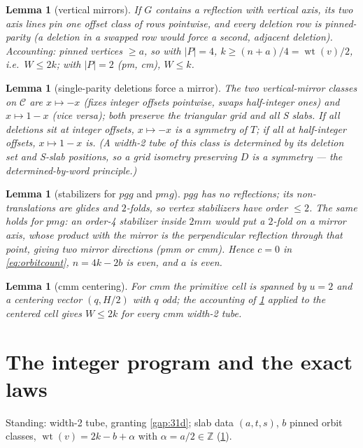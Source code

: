 \documentclass[11pt,a4paper,oneside]{article}
\theoremstyle{plain}
\newtheorem{lemma}[theorem]{Lemma}
\theoremstyle{definition}
\theoremstyle{remark}
\DeclareMathOperator{\wt}{wt}
\newcommand{\ZZ}{\mathbb{Z}}
\begin{document}
\begin{lemma}[vertical mirrors]\label{lem:vmirror}
If $G$ contains a reflection with vertical axis, its two axis lines pin one offset class of
rows pointwise, and every deletion row is pinned-parity (a deletion in a swapped row would
force a second, adjacent deletion). Accounting: pinned vertices $\ge a$, so with $|P| = 4$,
$k \ge (n + a)/4 = \wt(v)/2$, i.e.\ $W \le 2k$; with $|P| = 2$ (pm, cm), $W \le k$.
\end{lemma}

\begin{lemma}[single-parity deletions force a mirror]\label{lem:parity-mirror}
The two vertical-mirror classes on $\mathcal{C}$ are $x \mapsto -x$ (fixes integer offsets
pointwise, swaps half-integer ones) and $x \mapsto 1 - x$ (vice versa); both preserve the
triangular grid and all S slabs. If all deletions sit at integer offsets, $x \mapsto -x$ is
a symmetry of $T$; if all at half-integer offsets, $x \mapsto 1 - x$ is. (A width-2 tube of
this class is determined by its deletion set and S-slab positions, so a grid isometry
preserving $D$ is a symmetry --- the \emph{determined-by-word principle}.)
\end{lemma}

\begin{lemma}[stabilizers for $pgg$ and $pmg$]\label{lem:stab}
$pgg$ has no reflections; its non-translations are glides and $2$-folds, so vertex
stabilizers have order $\le 2$. The same holds for $pmg$: an order-4 stabilizer inside
$2mm$ would put a $2$-fold on a mirror axis, whose product with the mirror is the
perpendicular reflection through that point, giving two mirror directions (pmm or cmm).
Hence $c = 0$ in \cref{eq:orbitcount}, $n = 4k - 2b$ is even, and $a$ is even.
\end{lemma}

\begin{lemma}[cmm centering]\label{lem:cmm}
For cmm the primitive cell is spanned by $u = 2$ and a centering vector $(q, H/2)$ with $q$
odd; the accounting of \cref{lem:vmirror} applied to the centered cell gives $W \le 2k$ for
every cmm width-2 tube.
\end{lemma}

\section{The integer program and the exact laws}\label{sec:ip}

Standing: width-2 tube, granting \cref{gap:31d}; slab data $(a, t, s)$, $b$ pinned orbit
classes, $\wt(v) = 2k - b + \alpha$ with $\alpha = a/2 \in \ZZ$ (\cref{lem:stab}).
\end{document}
